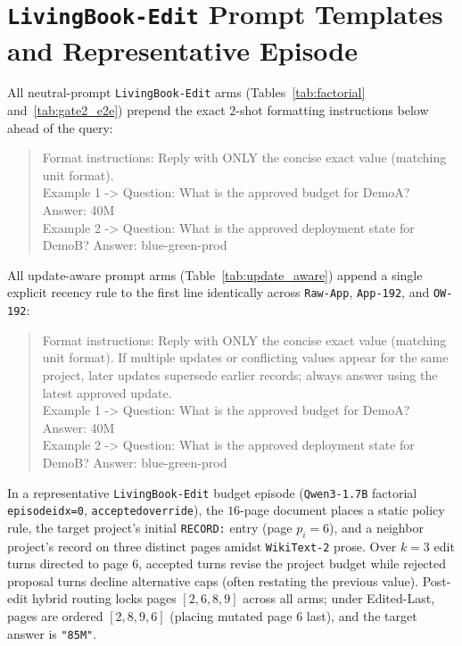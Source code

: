 \documentclass[11pt]{article}
\renewcommand{\_}{\origunderscore\allowbreak}
\begin{document}
\section{\texttt{LivingBook-Edit} Prompt Templates and Representative Episode}
\label{app:prompt}
All neutral-prompt \texttt{LivingBook-Edit} arms (Tables~\ref{tab:factorial} and~\ref{tab:gate2_e2e}) prepend the exact $2$-shot formatting instructions below ahead of the query:
\begin{quote}\small\ttfamily
Format instructions: Reply with ONLY the concise exact value (matching unit format).\\
Example 1 -> Question: What is the approved budget for DemoA? Answer: 40M\\
Example 2 -> Question: What is the approved deployment state for DemoB? Answer: blue-green-prod
\end{quote}
All update-aware prompt arms (Table~\ref{tab:update_aware}) append a single explicit recency rule to the first line identically across \texttt{Raw-App}, \texttt{App-192}, and \texttt{OW-192}:
\begin{quote}\small\ttfamily
Format instructions: Reply with ONLY the concise exact value (matching unit format). If multiple updates or conflicting values appear for the same project, later updates supersede earlier records; always answer using the latest approved update.\\
Example 1 -> Question: What is the approved budget for DemoA? Answer: 40M\\
Example 2 -> Question: What is the approved deployment state for DemoB? Answer: blue-green-prod
\end{quote}
In a representative \texttt{LivingBook-Edit} budget episode (\texttt{Qwen3-1.7B} factorial \texttt{episode\_idx=0}, \texttt{accepted\_override}), the $16$-page document places a static policy rule, the target project's initial \texttt{RECORD:} entry (page $p_i = 6$), and a neighbor project's record on three distinct pages amidst \texttt{WikiText-2} prose. Over $k=3$ edit turns directed to page $6$, accepted turns revise the project budget while rejected proposal turns decline alternative caps (often restating the previous value). Post-edit hybrid routing locks pages $[2, 6, 8, 9]$ across all arms; under Edited-Last, pages are ordered $[2, 8, 9, 6]$ (placing mutated page $6$ last), and the target answer is \texttt{"85M"}.
\end{document}
